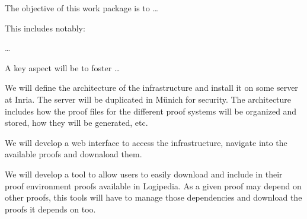 \begin{workpackage}[id=access,wphases=0-48,type=MGT,
  short=Access,%
  title={Access to the infrastructure},
  lead=Inr,
  InrRM=28]
  
\begin{wpobjectives}
  The objective of this work package is to \ldots

This includes notably:
  \begin{compactitem}
  \item \ldots
  \end{compactitem}
  A key aspect will be to foster \ldots
\end{wpobjectives}

\begin{wpdescription}

\end{wpdescription}

\begin{tasklist}

  \begin{task}[id=basic,title=Defining the architecture of the infrastructure]
    We will define the architecture of the infrastructure and install
    it on some server at Inria. The server will be duplicated in
    Münich for security. The architecture includes how the proof files
    for the different proof systems will be organized and stored, how
    they will be generated, etc.
  \end{task}

  \begin{task}[id=web,title=Giving access to the infrastructure on the world-wide web]
    We will develop a web interface to access the infrastructure,
    navigate into the available proofs and downaload them.
  \end{task}

  \begin{task}[id=opam,title=Giving access to the infrastructure in proof tools]
    We will develop a tool to allow users to easily download and
    include in their proof environment proofs available in
    Logipedia. As a given proof may depend on other proofs, this tools
    will have to manage those dependencies and download the proofs it
    depends on too.
  \end{task}


\end{tasklist}
\end{workpackage}

